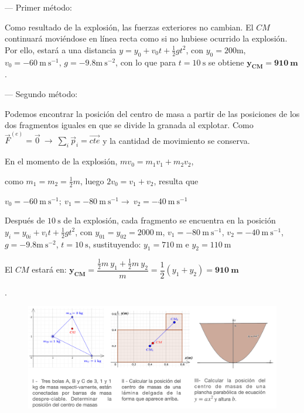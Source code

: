 --- Primer método:

Como resultado de la explosión, las fuerzas exteriores no cambian. El $CM$ continuará moviéndose en línea recta como si no hubiese ocurrido la explosión. Por ello, estará a una distancia $y=y_0+v_0t+\frac 1 2 g t^2$, con $y_0=200\mathrm{m}$, $v_0=-60\ \mathrm{m \ s}^{-1}$, $g=-9.8  \mathrm{m \ s}^{-2}$, con lo que para $t=10\ \text{s}$ se obtiene $\boldsymbol{y_{CM}=910\ \text{m}}$.

--- Segundo método:

Podemos encontrar la posición del centro de masa a partir de las posiciones de los dos fragmentos iguales en que se divide la granada al explotar. Como $\vec F^{(e)}=\vec 0 \ \to \ \displaystyle \sum_i \vec p_i=\overrightarrow{cte}$ y la cantidad de movimiento se conserva.

En el momento de la explosión, $mv_0=m_1v_1+m_2v_2$, 

como $m_1=m_2=\frac 1 2 m$, luego $2v_0=v_1+v_2$, resulta que

$v_0=-60\ \mathrm{m \ s}^{-1};\ v_1=-80\ \mathrm{m \ s}^{-1} \to \ v_2=-40\ \mathrm{m \ s}^{-1}$

Después de $10 \ \text{s}$ de la explosión, cada fragmento se encuentra en la posición $y_i=y_{0i}+v_it+\frac 1 2 g t^2$, con $y_{01}=y_{02}=2000\ \text{m}$, $v_1=-80\ \mathrm{m \ s}^{-1}$, $v_2=-40\ \mathrm{m \ s}^{-1}$, $g=-9.8  \mathrm{m \ s}^{-2}$, $t=10\ \text{s}$, sustituyendo: $y_1=710\ \text{m}$ e $y_2=110\ \text{m}$

El $CM$ estará en: $\boldsymbol{y_{CM}}=\dfrac{\frac 1 2 m \ y_1 + \frac 1 2 m \ y_2}{m}= \dfrac 1 2 (y_1+y_2)=\boldsymbol{910\ \text{m}}$


\begin{prob}.
	\begin{figure}[H]
	\centering
	\includegraphics[width=1\textwidth]{imagenes/imagenes12/T12IM06.png}
\end{figure}
\end{prob}

